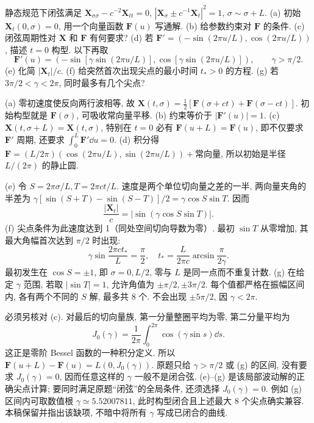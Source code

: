 \begin{exercise}
静态规范下闭弦满足
$\boldsymbol X_{\sigma\sigma}-c^{-2}\boldsymbol X_{tt}=0$,
$|\boldsymbol X_\sigma\pm c^{-1}\boldsymbol X_t|^2=1$, $\sigma\sim\sigma+L$.
(a) 初始 $\boldsymbol X_t(0,\sigma)=0$, 用一个向量函数 $\boldsymbol F(u)$ 写通解.
(b) 给参数约束对 $\boldsymbol F$ 的条件.
(c) 闭弦周期性对 $\boldsymbol X$ 和 $\boldsymbol F$ 有何要求?
(d) 若 $\boldsymbol F'=(-\sin(2\pi u/L),\cos(2\pi u/L))$, 描述 $t=0$ 构型.
以下再取
\[
 \boldsymbol F'(u)=
 \left(-\sin[\gamma\sin(2\pi u/L)],
 \cos[\gamma\sin(2\pi u/L)]\right),\qquad\gamma>\pi/2.
\]
(e) 化简 $|\boldsymbol X_t|/c$.
(f) 给突然首次出现尖点的最小时间 $t_*>0$ 的方程.
(g) 若 $3\pi/2<\gamma<2\pi$, 同时最多有几个尖点?
\end{exercise}
\begin{solution}
(a) 零初速度使反向两行波相等, 故
$\boldsymbol X(t,\sigma)=\frac12[\boldsymbol F(\sigma+ct)+\boldsymbol F(\sigma-ct)]$.
初始构型就是 $\boldsymbol F(\sigma)$, 可吸收常向量平移.
(b) 约束等价于 $|\boldsymbol F'(u)|=1$.
(c) $\boldsymbol X(t,\sigma+L)=\boldsymbol X(t,\sigma)$, 特别在 $t=0$ 必有 $\boldsymbol F(u+L)=\boldsymbol F(u)$, 即不仅要求 $\boldsymbol F'$ 周期, 还要求 $\int_0^L\boldsymbol F'\dd u=0$.
(d) 积分得 $\boldsymbol F=(L/2\pi)(\cos(2\pi u/L),\sin(2\pi u/L))+\text{常向量}$, 所以初始是半径 $L/(2\pi)$ 的静止圆.

(e) 令 $S=2\pi\sigma/L,T=2\pi ct/L$. 速度是两个单位切向量之差的一半, 两向量夹角的半差为
$\gamma[\sin(S+T)-\sin(S-T)]/2=\gamma\cos S\sin T$. 因而
\[
 \frac{|\boldsymbol X_t|}{c}
 =|\sin(\gamma\cos S\sin T)|.
\]
(f) 尖点条件为此速度达到 1（同处空间切向导数为零）. 最初 $\sin T$ 从零增加, 其最大角幅首次达到 $\pi/2$ 时出现:
\[
 \gamma\sin\frac{2\pi ct_*}{L}=\frac\pi2,
 \quad t_*=\frac{L}{2\pi c}\arcsin\frac{\pi}{2\gamma}.
\]
最初发生在 $\cos S=\pm1$, 即 $\sigma=0,L/2$, 零与 $L$ 是同一点而不重复计数.
(g) 在给定 $\gamma$ 范围, 若取 $|\sin T|=1$, 允许角值为 $\pm\pi/2,\pm3\pi/2$. 每个值都严格在振幅区间内, 各有两个不同的 $S$ 解, 最多共 8 个. 不会出现 $\pm5\pi/2$, 因 $\gamma<2\pi$.

必须另核对 (c). 对最后的切向量族, 第一分量整圈平均为零, 第二分量平均为
\[
 J_0(\gamma)=\frac1{2\pi}\int_0^{2\pi}\cos(\gamma\sin s)\dd s.
\]
这正是零阶 Bessel 函数的一种积分定义. 所以
$\boldsymbol F(u+L)-\boldsymbol F(u)=L(0,J_0(\gamma))$.
原题只给 $\gamma>\pi/2$ 或 (g) 的区间, 没有要求 $J_0(\gamma)=0$, 因而任意这样的 $\gamma$ 一般不是闭合弦. (e)--(g) 是该局部波动解的正确尖点计算; 要同时满足原题“闭弦”的全局条件, 还须选择 $J_0(\gamma)=0$.
例如 (g) 区间内可取数值根 $\gamma\simeq5.52007811$, 此时构型闭合且上述最大 8 个尖点确实兼容. 本稿保留并指出该缺项, 不暗中将所有 $\gamma$ 写成已闭合的曲线.
\end{solution}

